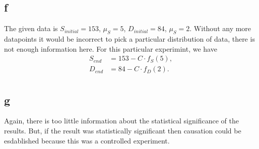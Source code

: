 \documentclass[a4paper]{article}
\begin{document}
\subsection*{f}
The given data is \(S_{initial} = 153\), \(\mu_S = 5\), \(D_{initial} = 84\), \(\mu_S = 2\). Without any more datapoints it would be incorrect to pick a particular distribution of data, there is not enough information here. For this particular experimint, we have 
\begin{align*}
	S_{end} &= 153- C \cdot f_S(5), \\
	D_{end} &= 84 - C \cdot f_D(2). \\
\end{align*}
\subsection*{g}
Again, there is too little information about the statistical significance of the results. But, if the result was statistically significant then causation could be esdablished because this was a controlled experiment.
\end{document}
